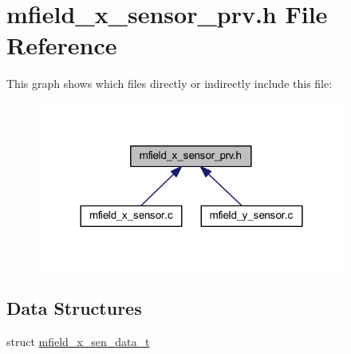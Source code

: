 \hypertarget{a00025}{\section{mfield\+\_\+x\+\_\+sensor\+\_\+prv.\+h File Reference}
\label{a00025}
}
This graph shows which files directly or indirectly include this file\+:\nopagebreak
\begin{figure}[H]
\begin{center}
\leavevmode
\includegraphics[width=288pt]{d3/dcd/a00965}
\end{center}
\end{figure}
\subsection*{Data Structures}
\begin{DoxyCompactItemize}
\item 
struct \hyperlink{a00025_d8/de9/a00595}{mfield\+\_\+x\+\_\+sen\+\_\+data\+\_\+t}
\end{DoxyCompactItemize}
